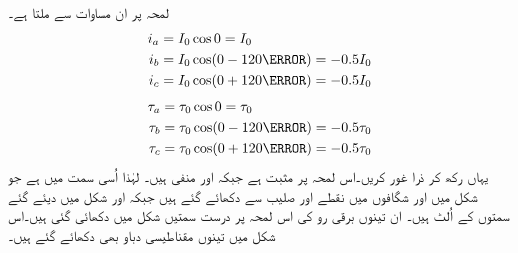 لمحہ  پر ان مساوات سے ملتا ہے۔
\begin{gather}
\begin{aligned}
i_a&=I_0 \cos 0=I_0\\
i_b&=I_0 \cos (0-120\degree)=-0.5 I_0\\
i_c&=I_0 \cos (0+120\degree)=-0.5 I_0
\end{aligned}
\end{gather}
%
\begin{gather}
\begin{aligned}
\tau_a&=\tau_0 \cos 0=\tau_0\\
\tau_b&=\tau_0 \cos (0-120\degree)=-0.5 \tau_0\\
\tau_c&=\tau_0 \cos (0+120\degree)=-0.5 \tau_0
\end{aligned}
\end{gather}
یہاں رکھ کر ذرا غور کریں۔اس لمحہ پر   مثبت ہے جبکہ  اور  منفی ہیں۔ لہٰذا   اُسی سمت میں ہے جو شکل   میں  اور  شگافوں میں نقطے اور صلیب سے  دکھائے  گئے ہیں جبکہ   اور  شکل میں دیئے گئے سمتوں کے اُلٹ ہیں۔ ان تینوں برقی رو کی اس لمحہ پر درست سمتیں شکل   میں دکھائی گئی ہیں۔اس شکل میں تینوں مقناطیسی دباو بھی دکھائے گئے ہیں۔

